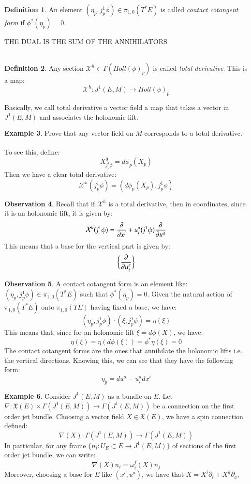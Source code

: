 \documentclass[12pt,a4paper]{report}
\theoremstyle{definition}
\newtheorem{Def}{Definition}[chapter]
\theoremstyle{Theorem}
\theoremstyle{break}
\newtheorem{Ex}[Def]{Example}
\theoremstyle{definition}
\newtheorem{Obs}[Def]{Observation}
\begin{document}
	\begin{Def}
		An element $(\eta_p,j^1_p\phi)\in \pi_{1,0}(T^*E)$ is called \textit{contact cotangent form} if $\phi^*(\eta_p)=0$.
	\end{Def}
	THE DUAL IS THE SUM OF THE ANNIHILATORS\\\\
	\begin{Def}
		Any section $\mathcal{X}^h\in\Gamma(Holl(\phi)_p)$ is called \textit{total derivative}.
		This is a map:
		$$\mathcal{X}^h:J^1(E,M)\rightarrow Holl(\phi)_p$$
	\end{Def}
	Basically, we call total derivative a vector field a map that takes a vector in $J^1(E,M)$ and associates the holonomic lift.
	\begin{Ex}
		Prove that any vector field on $M$ corresponds to a total derivative.\\
		\\
		To see this, define:
		$$X^0_{j^1_p\phi}=d\phi_p(X_p)$$
		Then we have a clear total derivative:
		$$\mathcal{X}^h(j^1_p\phi)=(d\phi_p(X_p),j^1_p\phi)$$
	\end{Ex}
	\begin{Obs}
		Recall that if $\mathcal{X}^h$ is a total derivative, then in coordinates, since it is an holonomic lift, it is given by:
		$$\mathcal{X}^h(j^1\phi)={\partial\over \partial x^i}+u_i^a(j^1\phi){\partial\over \partial u^a}$$
		This means that a base for the vertical part is given by:
		$$\bigg\{{\partial\over\partial u^a_i}\bigg\}$$
	\end{Obs}
	\begin{Obs}
		A contact cotangent form is an element like: $(\eta_p,j^1_p\phi)\in \pi_{1,0}(T^*E)$ such that $\phi^*(\eta_p)=0$. Given the natural action of $\pi_{1,0}(T^*E)$ onto $\pi_{1,0}(TE)$ having fixed a base, we have:
		$$(\eta_p,j^1_p\phi)\cdot (\xi,j^1_p\phi)=\eta(\xi)$$
		This means that, since for an holonomic lift $\xi=d\phi(X)$, we have:
		$$\eta(\xi)=\eta(d\phi(\xi))=\phi^*\eta(\xi)=0$$
		The contact cotangent forms are the ones that annihilate the holonomic lifts i.e. the vertical directions. Knowing this, we can see that they have the following form:
		$$\eta_p=du^a-u^a_idx^i$$
	\end{Obs}
	\begin{Ex}
		Consider $J^1(E,M)$ as a bundle on $E$.
		Let $\nabla:\mathfrak{X}(E)\times \Gamma(J^1(E,M))\rightarrow \Gamma(J^1(E,M))$ be a connection on the first order jet bundle. Choosing a vector field $X\in\mathfrak{X}(E)$, we have a spin connection defined:
		$$\nabla(X):\Gamma(J^1(E,M))\rightarrow \Gamma(J^1(E,M))$$
		In particular, for any frame $\{n_i:U_E\subset E\rightarrow J^1(E,M)\}$ of sections of the first order jet bundle, we can write:
		$$\nabla(X)n_i=\omega^j_i(X)n_j$$
		Moreover, choosing a base for $E$ like $(x^i,u^a)$, we have that $X=X^i\partial_i+X^a\partial_a$,
	\end{Ex}
\end{document}
